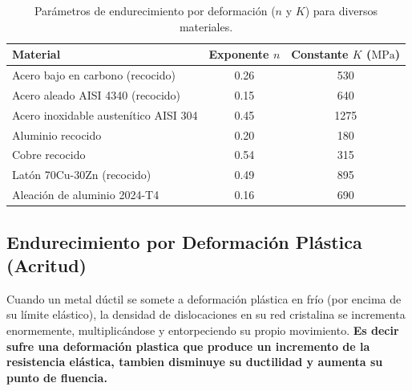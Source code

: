 \begin{table}[H]
    \centering
    \begin{tabular}{lcc}
        \toprule
        \textbf{Material}                     & \textbf{Exponente $n$} & \textbf{Constante $K$ ($\text{MPa}$)} \\
        \midrule
        Acero bajo en carbono (recocido)      & 0.26                   & 530                                   \\
        Acero aleado AISI 4340 (recocido)     & 0.15                   & 640                                   \\
        Acero inoxidable austenítico AISI 304 & 0.45                   & 1275                                  \\
        Aluminio recocido                     & 0.20                   & 180                                   \\
        Cobre recocido                        & 0.54                   & 315                                   \\
        Latón 70Cu-30Zn (recocido)            & 0.49                   & 895                                   \\
        Aleación de aluminio 2024-T4          & 0.16                   & 690                                   \\
        \bottomrule
    \end{tabular}
    \caption{Parámetros de endurecimiento por deformación ($n$ y $K$) para diversos materiales.}
    \label{tab:constantes_hollomon}
\end{table}

\subsection{Endurecimiento por Deformación Plástica (Acritud)}
Cuando un metal dúctil se somete a deformación plástica en frío (por encima de su límite elástico), la densidad de dislocaciones en su red cristalina se incrementa enormemente, multiplicándose y entorpeciendo su propio movimiento. \textbf{Es decir sufre una deformación plastica que produce un incremento de la resistencia elástica, tambien disminuye su ductilidad y aumenta su punto de fluencia.}

